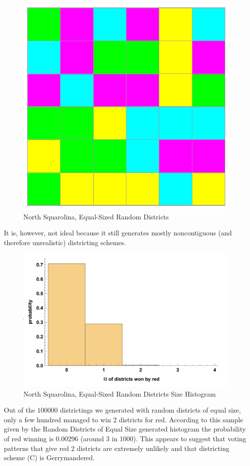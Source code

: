 \documentclass[12pt]{article}
\begin{document}
\begin{figure}[h!]
    \centering
    \includegraphics[scale=0.60]{rdeq_districting.pdf}
    \caption{North Squarolina, Equal-Sized Random Districts}
    \label{fig:rdeqd}
    \end{figure}
It is, however, not ideal because it still generates mostly noncontiguous (and therefore unrealistic) districting schemes. 
    \begin{figure}[h!]
    \centering
    \includegraphics[scale=0.5]{random_equal}
    \caption{North Squarolina, Equal-Sized Random Districts Size Histogram}
    \label{fig:random_equal}
    \end{figure}
Out of the $100000$ districtings we generated with random districts of equal size, only a few hundred managed to win 2 districts for red. According to this sample given by the Random Districts of Equal Size generated histogram the probability of red winning is 0.00296 (around 3 in 1000). This appears to suggest that voting patterns that give red 2 districts are extremely unlikely and that districting scheme (C) is Gerrymandered.
\end{document}
